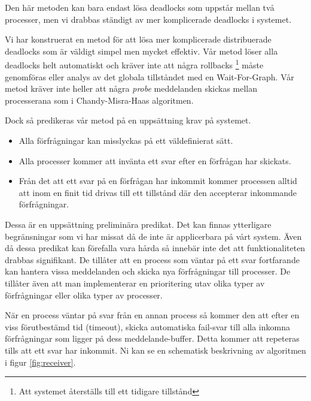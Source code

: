 Den här metoden kan bara endast lösa deadlocks som uppstår mellan två processer, men vi drabbas ständigt av mer komplicerade deadlocks i systemet.

Vi har konstruerat en metod för att lösa mer komplicerade distribuerade deadlocks som är väldigt simpel men mycket effektiv. Vår metod löser alla deadlocks helt automatiskt och kräver inte att några rollbacks \footnote{Att systemet återställs till ett tidigare tillstånd} måste genomföras eller analys av det globala tillståndet med en Wait-For-Graph.\citep{Reference6} Vår metod kräver inte heller att några \emph{probe} meddelanden skickas mellan processerana som i Chandy-Misra-Haas algoritmen.\citep{Reference7}

Dock så predikeras vår metod på en uppsättning krav på systemet.

\begin{itemize}
\item Alla förfrågningar kan misslyckas på ett väldefinierat sätt.

\item Alla processer kommer att invänta ett svar efter en förfrågan har skickats. 

\item Från det att ett svar på en förfrågan har inkommit kommer processen alltid att inom en finit tid drivas till ett tillstånd där den accepterar inkommande förfrågningar.
\end{itemize}

Dessa är en uppsättning preliminära predikat. Det kan finnas ytterligare begränsningar som vi har missat då de inte är applicerbara på vårt system. Även då dessa predikat kan förefalla vara hårda så innebär inte det att funktionaliteten drabbas signifikant. De tillåter att en process som väntar på ett svar fortfarande kan hantera vissa meddelanden och skicka nya förfrågningar till processer. De tillåter även att man implementerar en prioritering utav olika typer av förfrågningar eller olika typer av processer.

När en process väntar på svar från en annan process så kommer den att efter en viss förutbestämd tid (timeout), skicka automatiska fail-svar till alla inkomna förfrågningar som ligger på dess meddelande-buffer. Detta kommer att repeteras tills att ett svar har inkommit. Ni kan se en schematisk beskrivning av algoritmen i figur \ref{fig:receiver}.

